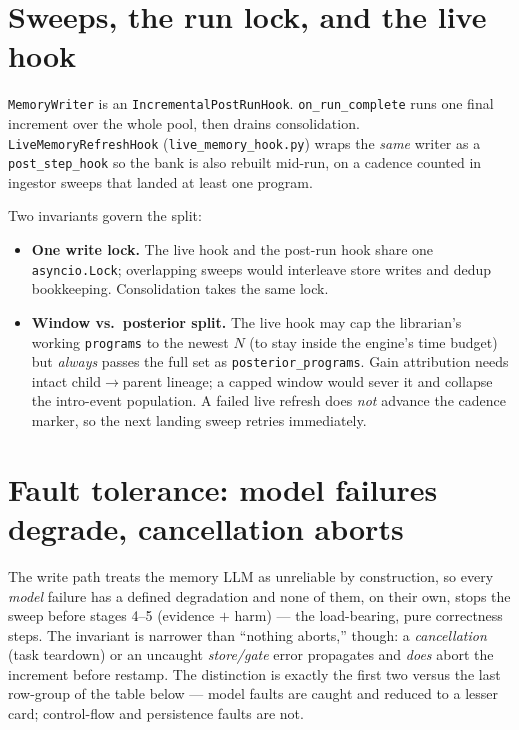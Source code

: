 \documentclass[11pt]{article}
\newcommand{\code}[1]{\texttt{\small #1}}
\begin{document}
\section{Sweeps, the run lock, and the live hook}
\label{sec:sweeps}

\code{MemoryWriter} is an \code{IncrementalPostRunHook}. \code{on\_run\_complete}
runs one final increment over the whole pool, then drains consolidation.
\code{LiveMemoryRefreshHook} (\code{live\_memory\_hook.py}) wraps the \emph{same}
writer as a \code{post\_step\_hook} so the bank is also rebuilt mid-run, on a
cadence counted in ingestor sweeps that landed at least one program.

Two invariants govern the split:
\begin{itemize}[leftmargin=1.6em, itemsep=1pt]
  \item \textbf{One write lock.} The live hook and the post-run hook share one
    \code{asyncio.Lock}; overlapping sweeps would interleave store writes and
    dedup bookkeeping. Consolidation takes the same lock.
  \item \textbf{Window vs.\ posterior split.} The live hook may cap the librarian's
    working \code{programs} to the newest $N$ (to stay inside the engine's time
    budget) but \emph{always} passes the full set as \code{posterior\_programs}.
    Gain attribution needs intact child$\to$parent lineage; a capped window would
    sever it and collapse the intro-event population. A failed live refresh does
    \emph{not} advance the cadence marker, so the next landing sweep retries
    immediately.
\end{itemize}

\section{Fault tolerance: model failures degrade, cancellation aborts}
\label{sec:faults}

The write path treats the memory LLM as unreliable by construction, so every
\emph{model} failure has a defined degradation and none of them, on their own, stops
the sweep before stages 4--5 (evidence $+$ harm) --- the load-bearing, pure
correctness steps. The invariant is narrower than ``nothing aborts,'' though: a
\emph{cancellation} (task teardown) or an uncaught \emph{store/gate} error propagates
and \emph{does} abort the increment before restamp. The distinction is exactly the
first two versus the last row-group of the table below --- model faults are caught
and reduced to a lesser card; control-flow and persistence faults are not.
\end{document}
